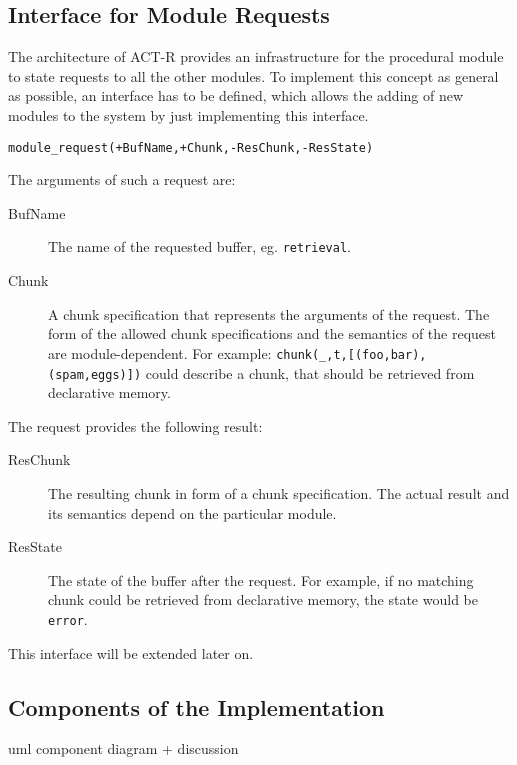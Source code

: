 \subsection{Interface for Module Requests}

The architecture of ACT-R provides an infrastructure for the procedural module to state requests to all the other modules. To implement this concept as general as possible, an interface has to be defined, which allows the adding of new modules to the system by just implementing this interface.

\begin{lstlisting}[caption={Simple Interface Module},label=lst:interface_module]
module_request(+BufName,+Chunk,-ResChunk,-ResState)
\end{lstlisting}

The arguments of such a request are:

\begin{description}
 \item[BufName] The name of the requested buffer, eg. \verb|retrieval|.
 \item[Chunk] A chunk specification that represents the arguments of the request. The form of the allowed chunk specifications and the semantics of the request are module-dependent. For example: \verb|chunk(_,t,[(foo,bar),(spam,eggs)])| could describe a chunk, that should be retrieved from declarative memory.
\end{description}

The request provides the following result:

\begin{description}
 \item[ResChunk] The resulting chunk in form of a chunk specification. The actual result and its semantics depend on the particular module.
 \item[ResState] The state of the buffer after the request. For example, if no matching chunk could be retrieved from declarative memory, the state would be \verb|error|.
\end{description}

This interface will be extended later on.

\subsection{Components of the Implementation}

uml component diagram + discussion



